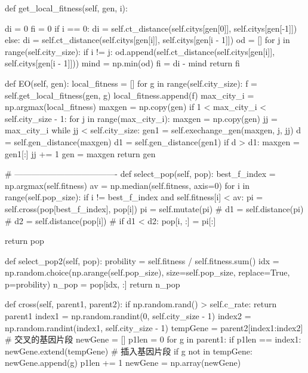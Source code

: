 \documentclass{ctexart}
\begin{document}
\begin{python}
    def get_local_fitness(self, gen, i):
 
        di = 0
        fi = 0
        if i == 0:
            di = self.ct_distance(self.citys[gen[0]], self.citys[gen[-1]])
        else:
            di = self.ct_distance(self.citys[gen[i]], self.citys[gen[i - 1]])
        od = []
        for j in range(self.city_size):
            if i != j:
                od.append(self.ct_distance(self.citys[gen[i]], self.citys[gen[i - 1]]))
        mind = np.min(od)
        fi = di - mind
        return fi

    def EO(self, gen):
        local_fitness = []
        for g in range(self.city_size):
            f = self.get_local_fitness(gen, g)
            local_fitness.append(f)
        max_city_i = np.argmax(local_fitness)
        maxgen = np.copy(gen)
        if 1 < max_city_i < self.city_size - 1:
            for j in range(max_city_i):
                maxgen = np.copy(gen)
                jj = max_city_i
                while jj < self.city_size:
                    gen1 = self.exechange_gen(maxgen, j, jj)
                    d = self.gen_distance(maxgen)
                    d1 = self.gen_distance(gen1)
                    if d > d1:
                        maxgen = gen1[:]
                    jj += 1
        gen = maxgen
        return gen

    # -------------------------------------
    def select_pop(self, pop):
        best_f_index = np.argmax(self.fitness)
        av = np.median(self.fitness, axis=0)
        for i in range(self.pop_size):
            if i != best_f_index and self.fitness[i] < av:
                pi = self.cross(pop[best_f_index], pop[i])
                pi = self.mutate(pi)
                # d1 = self.distance(pi)
                # d2 = self.distance(pop[i])
                # if d1 < d2:
                pop[i, :] = pi[:]

        return pop

    def select_pop2(self, pop):
        probility = self.fitness / self.fitness.sum()
        idx = np.random.choice(np.arange(self.pop_size), size=self.pop_size, replace=True, p=probility)
        n_pop = pop[idx, :]
        return n_pop

    def cross(self, parent1, parent2):
        if np.random.rand() > self.c_rate:
            return parent1
        index1 = np.random.randint(0, self.city_size - 1)
        index2 = np.random.randint(index1, self.city_size - 1)
        tempGene = parent2[index1:index2]  # 交叉的基因片段
        newGene = []
        p1len = 0
        for g in parent1:
            if p1len == index1:
                newGene.extend(tempGene)  # 插入基因片段
            if g not in tempGene:
                newGene.append(g)
            p1len += 1
        newGene = np.array(newGene)


\end{python}
\end{document}
